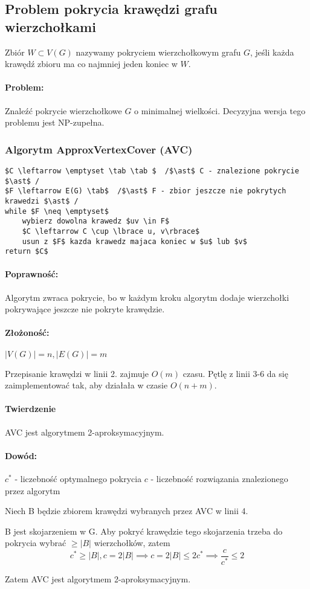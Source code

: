 \subsection{Problem pokrycia krawędzi grafu wierzchołkami}
Zbiór $W \subset V(G)$ nazywamy pokryciem wierzchołkowym grafu $G$, jeśli każda krawędź zbioru ma co najmniej jeden koniec w $W$.

\paragraph{Problem: }Znaleźć pokrycie wierzchołkowe $G$ o minimalnej wielkości. Decyzyjna wersja tego problemu jest NP-zupełna.

\subsubsection{Algorytm ApproxVertexCover (AVC)}
\begin{lstlisting}[caption={AVC(G)}]
$C \leftarrow \emptyset \tab \tab $  /$\ast$ C - znalezione pokrycie $\ast$ /
$F \leftarrow E(G) \tab$  /$\ast$ F - zbior jeszcze nie pokrytych krawedzi $\ast$ /
while $F \neq \emptyset$
	wybierz dowolna krawedz $uv \in F$
	$C \leftarrow C \cup \lbrace u, v\rbrace$
	usun z $F$ kazda krawedz majaca koniec w $u$ lub $v$
return $C$
\end{lstlisting}

\paragraph{Poprawność: } Algorytm zwraca pokrycie, bo w każdym kroku algorytm dodaje wierzchołki pokrywające jeszcze nie pokryte krawędzie.

\paragraph{Złożoność: } $|V(G)| =  n, |E(G)| = m$

Przepisanie krawędzi w linii 2. zajmuje $O(m)$ czasu.
Pętlę z linii 3-6 da się zaimplementować tak, aby działała w czasie $O(n+m)$.

\paragraph{Twierdzenie }AVC jest algorytmem 2-aproksymacyjnym.

\paragraph{Dowód:}
$c^{\ast}$ - liczebność optymalnego pokrycia
$c$ - liczebność rozwiązania znalezionego przez algorytm

Niech B będzie zbiorem krawędzi wybranych przez AVC w linii 4.

B jest skojarzeniem w G. Aby pokryć krawędzie tego skojarzenia trzeba do pokrycia wybrać $\geq \vert B\vert$ wierzchołków, zatem $$c^{\ast} \geq \vert B \vert, c = 2\vert B\vert \implies c = 2\vert B\vert \leq 2c^{\ast} \implies \frac{c}{c^{\ast}} \leq 2$$

Zatem AVC jest algorytmem 2-aproksymacyjnym.
